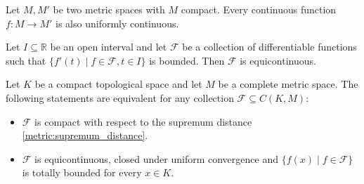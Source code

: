     \begin{theorem}
        Let $M,M'$ be two metric spaces with $M$ compact. Every continuous function $f:M\rightarrow M'$ is also uniformly continuous.
    \end{theorem}


    \begin{property}
        Let $I\subseteq\mathbb{R}$ be an open interval and let $\mathcal{F}$ be a collection of differentiable functions such that $\{f'(t)\mid f\in\mathcal{F},t\in I\}$ is bounded. Then $\mathcal{F}$ is equicontinuous.
    \end{property}

    \begin{theorem}
        Let $K$ be a compact topological space and let $M$ be a complete metric space. The following statements are equivalent for any collection $\mathcal{F}\subseteq C(K,M)$:
        \begin{itemize}
            \item $\mathcal{F}$ is compact with respect to the supremum distance \eqref{metric:supremum_distance}.
            \item $\mathcal{F}$ is equicontinuous, closed under uniform convergence and $\{f(x)\mid f\in\mathcal{F}\}$ is totally bounded for every $x\in K$.
        \end{itemize}
    \end{theorem}